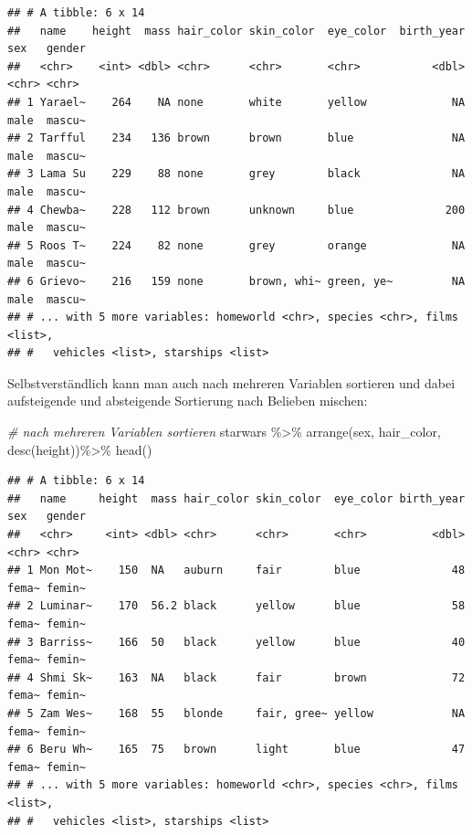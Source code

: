\documentclass[
]{book}
\newenvironment{Shaded}{\begin{snugshade}}{\end{snugshade}}
\newcommand{\CommentTok}[1]{\textcolor[rgb]{0.56,0.35,0.01}{\textit{#1}}}
\newcommand{\FunctionTok}[1]{\textcolor[rgb]{0.00,0.00,0.00}{#1}}
\newcommand{\NormalTok}[1]{#1}
\newcommand{\SpecialCharTok}[1]{\textcolor[rgb]{0.00,0.00,0.00}{#1}}
\begin{document}
\begin{verbatim}
## # A tibble: 6 x 14
##   name    height  mass hair_color skin_color  eye_color  birth_year sex   gender
##   <chr>    <int> <dbl> <chr>      <chr>       <chr>           <dbl> <chr> <chr> 
## 1 Yarael~    264    NA none       white       yellow             NA male  mascu~
## 2 Tarfful    234   136 brown      brown       blue               NA male  mascu~
## 3 Lama Su    229    88 none       grey        black              NA male  mascu~
## 4 Chewba~    228   112 brown      unknown     blue              200 male  mascu~
## 5 Roos T~    224    82 none       grey        orange             NA male  mascu~
## 6 Grievo~    216   159 none       brown, whi~ green, ye~         NA male  mascu~
## # ... with 5 more variables: homeworld <chr>, species <chr>, films <list>,
## #   vehicles <list>, starships <list>
\end{verbatim}

Selbstverständlich kann man auch nach mehreren Variablen sortieren und dabei aufsteigende und absteigende Sortierung nach Belieben mischen:

\begin{Shaded}
\begin{Highlighting}[]
\CommentTok{\# nach mehreren Variablen sortieren}
\NormalTok{starwars }\SpecialCharTok{\%\textgreater{}\%} 
  \FunctionTok{arrange}\NormalTok{(sex, hair\_color, }\FunctionTok{desc}\NormalTok{(height))}\SpecialCharTok{\%\textgreater{}\%} 
  \FunctionTok{head}\NormalTok{()}
\end{Highlighting}
\end{Shaded}

\begin{verbatim}
## # A tibble: 6 x 14
##   name     height  mass hair_color skin_color  eye_color birth_year sex   gender
##   <chr>     <int> <dbl> <chr>      <chr>       <chr>          <dbl> <chr> <chr> 
## 1 Mon Mot~    150  NA   auburn     fair        blue              48 fema~ femin~
## 2 Luminar~    170  56.2 black      yellow      blue              58 fema~ femin~
## 3 Barriss~    166  50   black      yellow      blue              40 fema~ femin~
## 4 Shmi Sk~    163  NA   black      fair        brown             72 fema~ femin~
## 5 Zam Wes~    168  55   blonde     fair, gree~ yellow            NA fema~ femin~
## 6 Beru Wh~    165  75   brown      light       blue              47 fema~ femin~
## # ... with 5 more variables: homeworld <chr>, species <chr>, films <list>,
## #   vehicles <list>, starships <list>
\end{verbatim}
\end{document}
